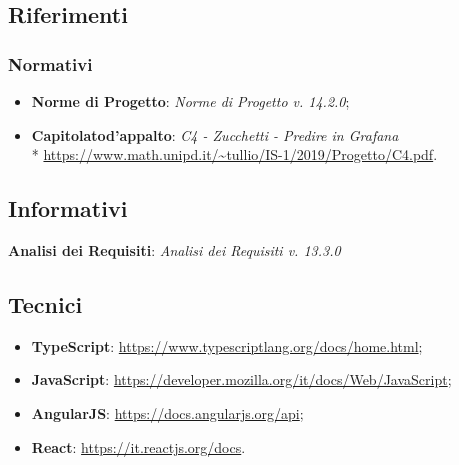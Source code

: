     \subsection{Riferimenti}
        \subsubsection{Normativi}
            \begin{itemize}
                \item \textbf{Norme di Progetto}: \textit{Norme di Progetto v. 14.2.0};
                \item \textbf{Capitolato}\glosp \textbf{d'appalto}: \textit{C4 - Zucchetti - Predire in Grafana}\glo \\*
                \url{https://www.math.unipd.it/~tullio/IS-1/2019/Progetto/C4.pdf}.
            \end{itemize}
        \subsection{Informativi}
                \item \textbf{Analisi dei Requisiti}: \textit{Analisi dei Requisiti v. 13.3.0}
        \subsection{Tecnici}
            \begin{itemize}
                \item \textbf{TypeScript}: \url{https://www.typescriptlang.org/docs/home.html};
                \item \textbf{JavaScript}: \url{https://developer.mozilla.org/it/docs/Web/JavaScript};
                \item \textbf{AngularJS}: \url{https://docs.angularjs.org/api};
                \item \textbf{React}: \url{https://it.reactjs.org/docs}.
            \end{itemize}